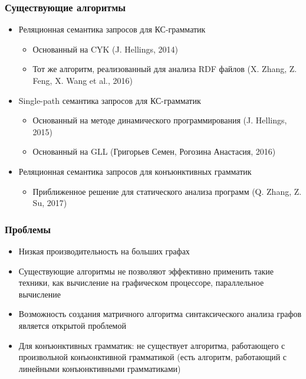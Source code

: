 \documentclass{beamer}
\begin{document}
\begin{frame}[fragile]
	\transwipe[direction=90]
	\frametitle{Существующие алгоритмы}
	\begin{itemize}
	   \item Реляционная семантика запросов для КС-грамматик
	   \begin{itemize}
	   	\item Основанный на CYK (J. Hellings, 2014) 
	   	\item Тот же алгоритм, реализованный для анализа RDF файлов (X. Zhang, Z. Feng, X. Wang et al., 2016)
	   \end{itemize}
   		\item Single-path семантика запросов для КС-грамматик
   	   \begin{itemize}
   	   	\item Основанный на методе динамического программирования (J. Hellings, 2015) 
   	   	\item Основанный на GLL (Григорьев Семен, Рогозина Анастасия, 2016)
   	   \end{itemize} 
       \item Реляционная семантика запросов для конъюнктивных грамматик
      \begin{itemize}
      	\item Приближенное решение для статического анализа программ (Q. Zhang, Z. Su, 2017)
      \end{itemize} 
	   
    \end{itemize}
\end{frame}

\begin{frame}[fragile]
	\transwipe[direction=90]
	\frametitle{Проблемы}
	\begin{itemize}
		\item Низкая производительность на больших графах
		\item Существующие алгоритмы не позволяют эффективно применить такие техники, как вычисление на графическом процессоре, параллельное вычисление
	   \item Возможность создания матричного алгоритма синтаксического анализа графов является открытой проблемой
	   \item Для конъюнктивных грамматик: не существует алгоритма, работающего с произвольной конъюнктивной грамматикой (есть алгоритм, работающий с линейными конъюнктивными грамматиками)
    \end{itemize}
\end{frame}
\end{document}
